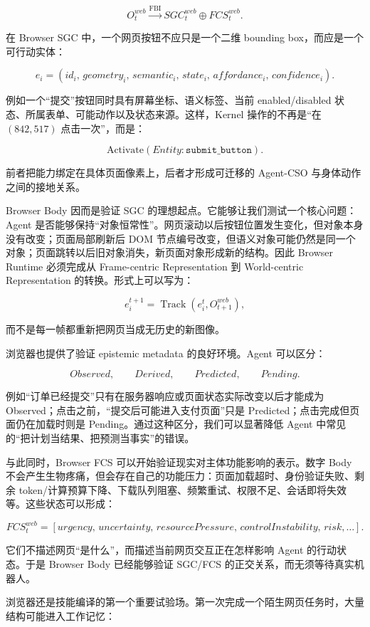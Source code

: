 $$
O_t^{web}
\xrightarrow{\mathrm{FBI}}
SGC_t^{web}\oplus FCS_t^{web}.
$$

在 Browser SGC 中，一个网页按钮不应只是一个二维 bounding box，而应是一个可行动实体：

$$
e_i=
(
id_i,\,
geometry_i,\,
semantic_i,\,
state_i,\,
affordance_i,\,
confidence_i
).
$$

例如一个“提交”按钮同时具有屏幕坐标、语义标签、当前 enabled/disabled 状态、所属表单、可能动作以及状态来源。这样，Kernel 操作的不再是“在 $(842,517)$ 点击一次”，而是：

$$
\mathrm{Activate}(Entity:\texttt{submit\_button}).
$$

前者把能力绑定在具体页面像素上，后者才形成可迁移的 Agent-CSO 与身体动作之间的接地关系。

Browser Body 因而是验证 SGC 的理想起点。它能够让我们测试一个核心问题：Agent 是否能够保持“对象恒常性”。网页滚动以后按钮位置发生变化，但对象本身没有改变；页面局部刷新后 DOM 节点编号改变，但语义对象可能仍然是同一个对象；页面跳转以后旧对象消失，新页面对象形成新的结构。因此 Browser Runtime 必须完成从 Frame-centric Representation 到 World-centric Representation 的转换。形式上可以写为：

$$
e_i^{t+1}
=
\operatorname{Track}
\left(
e_i^t,O_{t+1}^{web}
\right),
$$

而不是每一帧都重新把网页当成无历史的新图像。

浏览器也提供了验证 epistemic metadata 的良好环境。Agent 可以区分：

$$
Observed,\qquad
Derived,\qquad
Predicted,\qquad
Pending.
$$

例如“订单已经提交”只有在服务器响应或页面状态实际改变以后才能成为 Observed；点击之前，“提交后可能进入支付页面”只是 Predicted；点击完成但页面仍在加载时则是 Pending。通过这种区分，我们可以显著降低 Agent 中常见的“把计划当结果、把预测当事实”的错误。

与此同时，Browser FCS 可以开始验证现实对主体功能影响的表示。数字 Body 不会产生生物疼痛，但会存在自己的功能压力：页面加载超时、身份验证失败、剩余 token/计算预算下降、下载队列阻塞、频繁重试、权限不足、会话即将失效等。这些状态可以形成：

$$
FCS_t^{web}
=
[
urgency,\,
uncertainty,\,
resourcePressure,\,
controlInstability,\,
risk,\ldots
].
$$

它们不描述网页“是什么”，而描述当前网页交互正在怎样影响 Agent 的行动状态。于是 Browser Body 已经能够验证 SGC/FCS 的正交关系，而无须等待真实机器人。

浏览器还是技能编译的第一个重要试验场。第一次完成一个陌生网页任务时，大量结构可能进入工作记忆：

